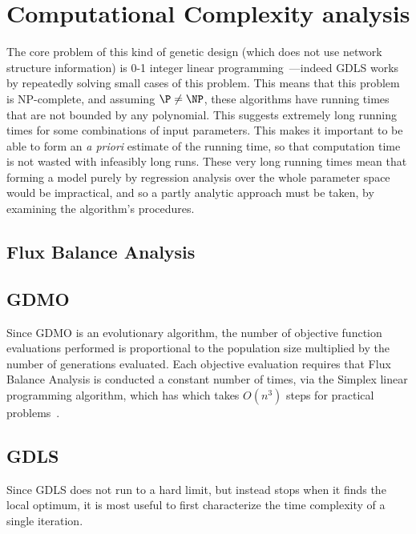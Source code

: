 \section{Computational Complexity analysis}
The core problem of this kind of genetic design (which does not use network structure information) is 0-1 integer linear programming~\cite{Karp1972}---indeed GDLS works by repeatedly solving small cases of this problem.
This means that this problem is NP-complete, and assuming \(\P \neq \NP\), these algorithms have running times that are not bounded by any polynomial.
This suggests extremely long running times for some combinations of input parameters.
This makes it important to be able to form an \emph{a priori} estimate of the running time, so that computation time is not wasted with infeasibly long runs.
These very long running times mean that forming a model purely by regression analysis over the whole parameter space would be impractical, and so a partly analytic approach must be taken, by examining the algorithm's procedures.

\subsection{Flux Balance Analysis}

\subsection{GDMO}
Since GDMO is an evolutionary algorithm, the number of objective function evaluations performed is proportional to the population size multiplied by the number of generations evaluated.
Each objective evaluation requires that Flux Balance Analysis is conducted a constant number of times, via the Simplex linear programming algorithm, which has which takes \(O(n^3)\) steps for practical problems~\cite{
Dantzig1963}.

\subsection{GDLS}
Since GDLS does not run to a hard limit, but instead stops when it finds the local optimum, it is most useful to first characterize the time complexity of a single iteration.